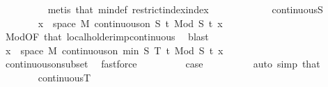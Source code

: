 \begin{isabellebody}
\ \ \ \ \ \ \ \ \isamarkupfalse%
\ {\isacharparenleft}{\kern0pt}metis\ that\ min{\isacharunderscore}{\kern0pt}def\ restrict{\isacharunderscore}{\kern0pt}index{\isacharunderscore}{\kern0pt}index{\isacharparenright}{\kern0pt}\isanewline
\ \ \ \ \isamarkupfalse%
\isanewline
\ \ \ \ \ \ \isamarkupfalse%
\ {\isacharparenleft}{\kern0pt}continuous{\isacharunderscore}{\kern0pt}S{\isacharparenright}{\kern0pt}\isanewline
\ \ \ \ \ \ \isamarkupfalse%
\ {\isachardoublequoteopen}{\isasymforall}x\ {\isasymin}\ space\ {\isacharquery}{\kern0pt}M{\isachardot}{\kern0pt}\ continuous{\isacharunderscore}{\kern0pt}on\ {\isacharbraceleft}{\kern0pt}{}{\isachardot}{\kern0pt}{\isachardot}{\kern0pt}S{\isacharbraceright}{\kern0pt}\ {\isacharparenleft}{\kern0pt}{\isasymlambda}t{\isachardot}{\kern0pt}\ {\isacharparenleft}{\kern0pt}Mod\ S{\isacharparenright}{\kern0pt}\ t\ x{\isacharparenright}{\kern0pt}{\isachardoublequoteclose}\isanewline
\ \ \ \ \ \ \ \ \isamarkupfalse%
\ Mod{\isacharbrackleft}{\kern0pt}OF\ that{\isacharparenleft}{\kern0pt}{}{\isacharparenright}{\kern0pt}{\isacharbrackright}{\kern0pt}\ local{\isacharunderscore}{\kern0pt}holder{\isacharunderscore}{\kern0pt}imp{\isacharunderscore}{\kern0pt}continuous\ \isamarkupfalse%
\ blast\isanewline
\ \ \ \ \ \ \isamarkupfalse%
\ \isamarkupfalse%
\ {\isachardoublequoteopen}{\isasymforall}x\ {\isasymin}\ space\ {\isacharquery}{\kern0pt}M{\isachardot}{\kern0pt}\ continuous{\isacharunderscore}{\kern0pt}on\ {\isacharbraceleft}{\kern0pt}{}{\isachardot}{\kern0pt}{\isachardot}{\kern0pt}min\ S\ T{\isacharbraceright}{\kern0pt}\ {\isacharparenleft}{\kern0pt}{\isasymlambda}t{\isachardot}{\kern0pt}\ {\isacharparenleft}{\kern0pt}Mod\ S{\isacharparenright}{\kern0pt}\ t\ x{\isacharparenright}{\kern0pt}{\isachardoublequoteclose}\isanewline
\ \ \ \ \ \ \ \ \isamarkupfalse%
\ continuous{\isacharunderscore}{\kern0pt}on{\isacharunderscore}{\kern0pt}subset\ \isamarkupfalse%
\ fastforce\isanewline
\ \ \ \ \ \ \isamarkupfalse%
\ \isamarkupfalse%
\ {\isacharquery}{\kern0pt}case\isanewline
\ \ \ \ \ \ \ \ \isamarkupfalse%
\ {\isacharparenleft}{\kern0pt}auto\ simp{\isacharcolon}{\kern0pt}\ that{\isacharparenleft}{\kern0pt}{}{\isacharparenright}{\kern0pt}{\isacharparenright}{\kern0pt}\isanewline
\ \ \ \ \isamarkupfalse%
\isanewline
\ \ \ \ \ \ \isamarkupfalse%
\ {\isacharparenleft}{\kern0pt}continuous{\isacharunderscore}{\kern0pt}T{\isacharparenright}{\kern0pt}\isanewline

\end{isabellebody}
